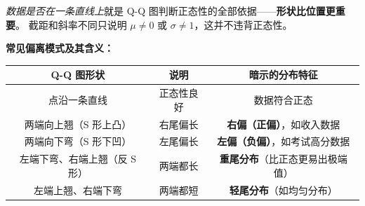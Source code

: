\emph{数据是否在一条直线上}就是 Q-Q 图判断正态性的全部依据——\textbf{形状比位置更重要}。
截距和斜率不同只说明 $\mu \neq 0$ 或 $\sigma \neq 1$，这并不违背正态性。

\medskip
\textbf{常见偏离模式及其含义：}

\begin{center}
\renewcommand{\arraystretch}{1.3}
\begin{tabular}{c|c|c}
\toprule
\textbf{Q-Q 图形状} & \textbf{说明} & \textbf{暗示的分布特征} \\
\midrule
点沿一条直线 & 正态性良好 & 数据符合正态 \\
两端向上翘（S 形上凸） & 右尾偏长 & \textbf{右偏（正偏）}，如收入数据 \\
两端向下弯（S 形下凹） & 左尾偏长 & \textbf{左偏（负偏）}，如考试高分数据 \\
左端下弯、右端上翘（反 S 形） & 两端都长 & \textbf{重尾分布}（比正态更易出极端值） \\
左端上翘、右端下弯 & 两端都短 & \textbf{轻尾分布}（如均匀分布） \\
\bottomrule
\end{tabular}
\end{center}

